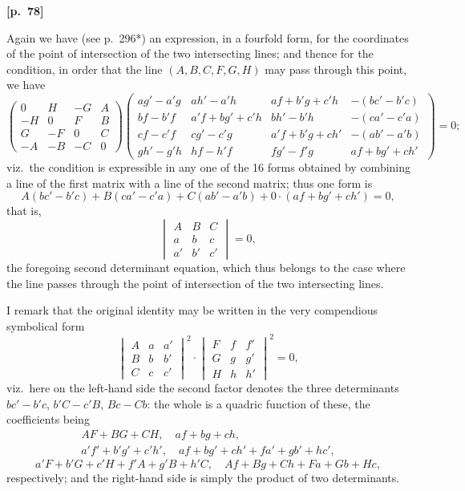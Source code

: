 \documentclass[11pt,a4paper]{article}
\theoremstyle{plain}
\begin{document}
\vspace{0.5em}
\noindent\textbf{[p.\ 78]}

Again we have (see p.\ 296*) an expression, in a fourfold form, for the coordinates of the point of intersection of the two intersecting lines; and thence for the condition, in order that the line $(A, B, C, F, G, H)$ may pass through this point, we have
$$
\begin{pmatrix}
0 & H & -G & A \\
-H & 0 & F & B \\
G & -F & 0 & C \\
-A & -B & -C & 0
\end{pmatrix}
\begin{pmatrix}
ag' - a'g & ah' - a'h & af + b'g + c'h & -(bc' - b'c) \\
bf - b'f & a'f + bg' + c'h & bh' - b'h & -(ca' - c'a) \\
cf - c'f & cg' - c'g & a'f + b'g + ch' & -(ab' - a'b) \\
gh' - g'h & hf - h'f & fg' - f'g & af + bg' + ch'
\end{pmatrix}
= 0;
$$
viz.\ the condition is expressible in any one of the 16 forms obtained by combining a line of the first matrix with a line of the second matrix; thus one form is
$$
A(bc' - b'c) + B(ca' - c'a) + C(ab' - a'b) + 0 \cdot (af + bg' + ch') = 0,
$$
that is,
$$
\begin{vmatrix} A & B & C \\ a & b & c \\ a' & b' & c' \end{vmatrix} = 0,
$$
the foregoing second determinant equation, which thus belongs to the case where the line passes through the point of intersection of the two intersecting lines.

I remark that the original identity may be written in the very compendious symbolical form
$$
\begin{vmatrix} A & a & a' \\ B & b & b' \\ C & c & c' \end{vmatrix}^2
\cdot
\begin{vmatrix} F & f & f' \\ G & g & g' \\ H & h & h' \end{vmatrix}^2
= 0,
$$
viz.\ here on the left-hand side the second factor denotes the three determinants $bc' - b'c$, $b'C - c'B$, $Bc - Cb$: the whole is a quadric function of these, the coefficients being
\begin{gather*}
AF + BG + CH, \quad af + bg + ch, \\
a'f' + b'g' + c'h', \quad af + bg' + ch' + fa' + gb' + hc',
\end{gather*}
$$
a'F + b'G + c'H + f'A + g'B + h'C, \quad Af + Bg + Ch + Fa + Gb + Hc,
$$
respectively; and the right-hand side is simply the product of two determinants.
\end{document}
